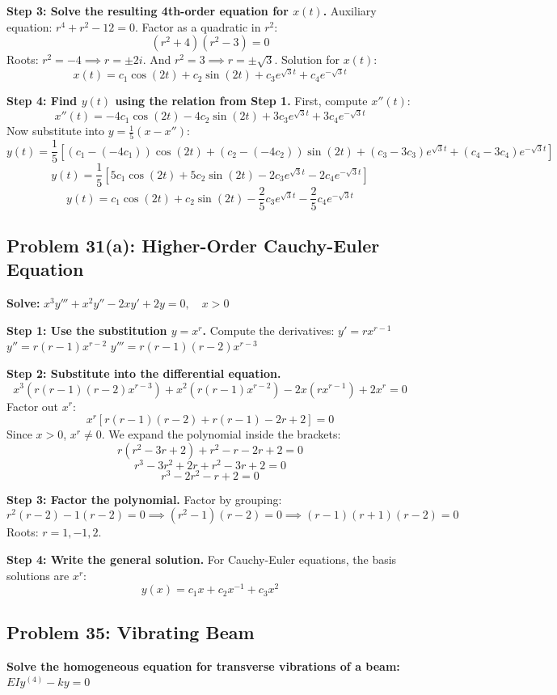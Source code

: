 \documentclass[11pt]{article}
\begin{document}
\textbf{Step 3: Solve the resulting 4th-order equation for $x(t)$.}
Auxiliary equation: $r^4 + r^2 - 12 = 0$.
Factor as a quadratic in $r^2$:
\[ (r^2 + 4)(r^2 - 3) = 0 \]
Roots: $r^2 = -4 \implies r = \pm 2i$. And $r^2 = 3 \implies r = \pm \sqrt{3}$.
Solution for $x(t)$:
\[ x(t) = c_1 \cos(2t) + c_2 \sin(2t) + c_3 e^{\sqrt{3}t} + c_4 e^{-\sqrt{3}t} \]

\textbf{Step 4: Find $y(t)$ using the relation from Step 1.}
First, compute $x''(t)$:
\[ x''(t) = -4c_1 \cos(2t) - 4c_2 \sin(2t) + 3c_3 e^{\sqrt{3}t} + 3c_4 e^{-\sqrt{3}t} \]
Now substitute into $y = \frac{1}{5}(x - x'')$:
\[ y(t) = \frac{1}{5} \left[ (c_1 - (-4c_1))\cos(2t) + (c_2 - (-4c_2))\sin(2t) + (c_3 - 3c_3)e^{\sqrt{3}t} + (c_4 - 3c_4)e^{-\sqrt{3}t} \right] \]
\[ y(t) = \frac{1}{5} \left[ 5c_1 \cos(2t) + 5c_2 \sin(2t) - 2c_3 e^{\sqrt{3}t} - 2c_4 e^{-\sqrt{3}t} \right] \]
\[ y(t) = c_1 \cos(2t) + c_2 \sin(2t) - \frac{2}{5}c_3 e^{\sqrt{3}t} - \frac{2}{5}c_4 e^{-\sqrt{3}t} \]

\subsection{Problem 31(a): Higher-Order Cauchy-Euler Equation}
\textbf{Solve:} $x^3 y''' + x^2 y'' - 2x y' + 2y = 0, \quad x > 0$

\textbf{Step 1: Use the substitution $y = x^r$.}
Compute the derivatives:
$y' = r x^{r-1}$
$y'' = r(r-1) x^{r-2}$
$y''' = r(r-1)(r-2) x^{r-3}$

\textbf{Step 2: Substitute into the differential equation.}
\[ x^3 (r(r-1)(r-2) x^{r-3}) + x^2 (r(r-1) x^{r-2}) - 2x (r x^{r-1}) + 2 x^r = 0 \]
Factor out $x^r$:
\[ x^r [ r(r-1)(r-2) + r(r-1) - 2r + 2 ] = 0 \]
Since $x > 0$, $x^r \neq 0$. We expand the polynomial inside the brackets:
\[ r(r^2 - 3r + 2) + r^2 - r - 2r + 2 = 0 \]
\[ r^3 - 3r^2 + 2r + r^2 - 3r + 2 = 0 \]
\[ r^3 - 2r^2 - r + 2 = 0 \]

\textbf{Step 3: Factor the polynomial.}
Factor by grouping:
\[ r^2(r - 2) - 1(r - 2) = 0 \implies (r^2 - 1)(r - 2) = 0 \implies (r - 1)(r + 1)(r - 2) = 0 \]
Roots: $r = 1, -1, 2$.

\textbf{Step 4: Write the general solution.}
For Cauchy-Euler equations, the basis solutions are $x^r$:
\[ y(x) = c_1 x + c_2 x^{-1} + c_3 x^2 \]

\subsection{Problem 35: Vibrating Beam}
\textbf{Solve the homogeneous equation for transverse vibrations of a beam:} $EI y^{(4)} - ky = 0$
\end{document}
